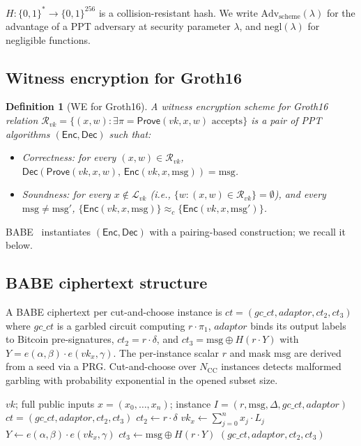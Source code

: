 \documentclass[11pt]{article}
\newtheorem{definition}{Definition}
\newcommand{\msg}{\mathrm{msg}}
\newcommand{\Enc}{\mathsf{Enc}}
\newcommand{\Dec}{\mathsf{Dec}}
\newcommand{\Adv}{\mathrm{Adv}}
\newcommand{\negl}{\mathrm{negl}}
\begin{document}
$H : \{0,1\}^* \to \{0,1\}^{256}$ is a collision-resistant hash. We
write $\Adv_{\mathrm{scheme}}(\lambda)$ for the advantage of a PPT
adversary at security parameter $\lambda$, and $\negl(\lambda)$ for
negligible functions.

\subsection{Witness encryption for Groth16}

\begin{definition}[WE for Groth16]
A witness encryption scheme for Groth16 relation
$\mathcal{R}_{vk} = \{(x, w) : \exists \pi = \mathsf{Prove}(vk, x, w)
\text{ accepts}\}$ is a pair of PPT algorithms $(\Enc, \Dec)$ such
that:
\begin{itemize}
  \item \emph{Correctness:} for every $(x, w) \in \mathcal{R}_{vk}$,
    $\Dec(\mathsf{Prove}(vk, x, w),\, \Enc(vk, x, \msg)) = \msg$.
  \item \emph{Soundness:} for every $x \notin \mathcal{L}_{vk}$ (i.e.,
    $\{w : (x, w) \in \mathcal{R}_{vk}\} = \emptyset$), and every
    $\msg \neq \msg'$,
    $\{\Enc(vk, x, \msg)\} \approx_c \{\Enc(vk, x, \msg')\}$.
\end{itemize}
\end{definition}

BABE~\cite{babe2026} instantiates $(\Enc, \Dec)$ with a pairing-based
construction; we recall it below.

\subsection{BABE ciphertext structure}

A BABE ciphertext per cut-and-choose instance is
$ct = (gc\_ct, adaptor, ct_2, ct_3)$ where
$gc\_ct$ is a garbled circuit computing $r \cdot \pi_1$, $adaptor$
binds its output labels to Bitcoin pre-signatures, $ct_2 = r \cdot \delta$,
and $ct_3 = \msg \oplus H(r \cdot Y)$ with
$Y = e(\alpha, \beta) \cdot e(vk_x, \gamma)$. The per-instance scalar
$r$ and mask $\msg$ are derived from a seed via a PRG. Cut-and-choose
over $N_{\mathrm{CC}}$ instances detects malformed garbling with
probability exponential in the opened subset size.

\begin{algorithm}[H]
\caption{BABE $\Enc(vk, x;\, I)$ \hfill{\footnotesize Verifier, off-chain, $T_0$}}
\label{alg:babe-enc}
\begin{algorithmic}[1]
\Require $vk$; full public inputs $x = (x_0, \ldots, x_n)$;
  instance $I = (r, \msg, \Delta, gc\_ct, adaptor)$
\Ensure $ct = (gc\_ct, adaptor, ct_2, ct_3)$
\State $ct_2 \gets r \cdot \delta$
\State $vk_x \gets \sum_{j=0}^{n} x_j \cdot L_j$ 
\State $Y \gets e(\alpha, \beta) \cdot e(vk_x, \gamma)$
\State $ct_3 \gets \msg \oplus H(r \cdot Y)$
\State \Return $(gc\_ct, adaptor, ct_2, ct_3)$
\end{algorithmic}
\end{algorithm}
\end{document}
